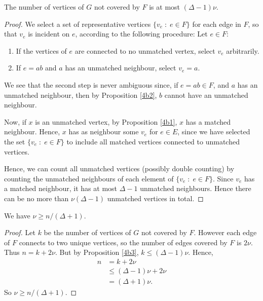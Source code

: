 \documentclass{unswmaths}
\begin{document}
\begin{proposition}
\label{4b3}
The number of vertices of $G$ not covered by $F$ is at most $(\Delta-1)\nu$.
\end{proposition}
\begin{proof}
    We select a set of representative vertices $\{v_e\;:\; e \in F\}$
    for each edge in $F$, so that $v_e$ is incident on $e$, according to the following
    procedure: Let $e \in F$:
    \begin{enumerate}
        \item{} If the vertices of $e$ are connected to no unmatched vertex, select
        $v_e$ arbitrarily.
        \item{} If $e = ab$ and $a$ has an unmatched neighbour, select $v_e = a$.
    \end{enumerate}
    We see that the second step is never ambiguous since, if $e = ab \in F$,
    and $a$ has an unmatched neighbour, then by Proposition \ref{4b2}, 
    $b$ cannot have an unmatched neighbour. 
    
    Now, if $x$ is an unmatched vertex, by Proposition \ref{4b1}, $x$ has a matched
    neighbour. Hence, $x$ has as neighbour some $v_e$ for $e \in E$, since
    we have selected the set $\{v_e\;:\;e \in F\}$ to include all matched
    vertices connected to unmatched vertices.
    
    Hence, we can count all unmatched vertices (possibly double counting) by counting the
    unmatched neighbours of each element of $\{v_e\;:\;e \in F\}$. Since $v_e$
    has a matched neighbour, it has at most $\Delta-1$ unmatched neighbours.
    Hence there can be no more than $\nu(\Delta-1)$ unmatched vertices in total.    
\end{proof}
\begin{proposition}[Part (b) iv]
\label{4b4}
We have $\nu \geq n/(\Delta+1)$.
\end{proposition}
\begin{proof}
    Let $k$ be the number of vertices of $G$ not covered by $F$.
    However each edge of $F$ connects to two unique vertices, so the number
    of edges covered by $F$ is $2\nu$.
    Thus
    $n = k+2\nu$. But by Proposition \ref{4b3}, $k \leq (\Delta-1)\nu$.
    Hence,
    \begin{align}
        n &= k+2\nu\\
        &\leq (\Delta-1)\nu+2\nu\\
        &= (\Delta+1)\nu.
    \end{align}
    So $\nu \geq n/(\Delta+1)$.
\end{proof}
\end{document}
